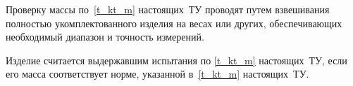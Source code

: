 Проверку массы по~\ref{t_kt_m} настоящих~ТУ проводят путем взвешивания полностью укомплектованного изделия на весах \hyperref[e:scales]{\scales} или других, обеспечивающих необходимый диапазон и точность измерений.

Изделие считается выдержавшим испытания по \ref{t_kt_m} настоящих~ТУ, если его масса соответствует норме, указанной в~\ref{t_kt_m} настоящих~ТУ.